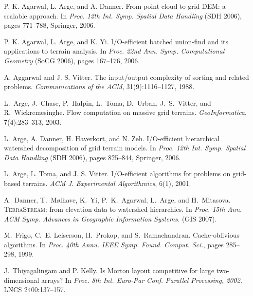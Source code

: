 \documentclass[10pt,a4paper]{article}
\begin{document}
\begin{thebibliography}{10}
P. K. Agarwal, L. Arge, and A. Danner.
From point cloud to grid DEM: a scalable approach.
In {\em Proc. 12th Int. Symp. Spatial Data Handling} (SDH 2006), pages 771--788, Springer, 2006.

P. K. Agarwal, L. Arge, and K. Yi.
I/O-efficient batched union-find and its applications to terrain analysis.
In {\em Proc. 22nd Ann. Symp. Computational Geometry} (SoCG 2006), pages 167--176, 2006.

A. Aggarwal and J. S. Vitter.
The input/output complexity of sorting and related problems.
{\em Communications of the ACM}, 31(9):1116--1127, 1988.

L.~Arge, J.~Chase, P.~Halpin, L.~Toma, D.~Urban, J.~S.~Vitter, and R.~Wickremesinghe.
Flow computation on massive grid terrains.
{\em GeoInformatica}, 7(4):283--313, 2003.

L. Arge, A. Danner, H. Haverkort, and N. Zeh.
I/O-efficient hierarchical watershed decomposition of grid terrain models.
In {\em Proc. 12th Int. Symp. Spatial Data Handling} (SDH 2006), pages 825--844, Springer, 2006.

L. Arge, L. Toma, and J. S. Vitter.
I/O-efficient algorithms for problems on grid-based terrains.
{\em ACM J. Experimental Algorithmics}, 6(1), 2001.

A.~Danner, T.~M\o lhave, K.~Yi, P.~K.~Agarwal, L.~Arge, and H.~Mitasova.
\textsc{TerraStream:} from elevation data to watershed hierarchies.
In {\em Proc. 15th Ann. ACM Symp. Advances in Geographic Information Systems.} (GIS 2007).

M.~Frigo, C.~E. Leiserson, H.~Prokop, and S.~Ramachandran.
Cache-oblivious algorithms.
In {\em Proc. 40th Annu. IEEE Symp. Found. Comput. Sci.}, pages
  285--298, 1999.

J.~Thiyagalingam and P. Kelly.
Is Morton layout competitive for large two-dimensional arrays?
In {\em Proc. 8th Int. Euro-Par Conf. Parallel Processing, 2002,} LNCS 2400:137--157.

\end{thebibliography}
\end{document}
